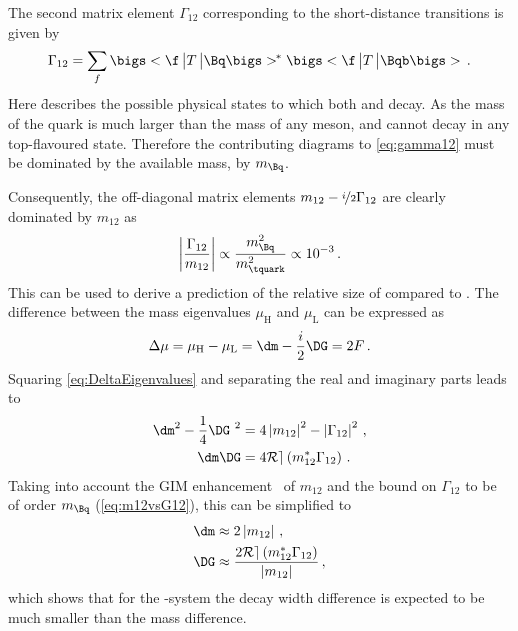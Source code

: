 The second matrix element $\Gamma_{12}$ corresponding to the short-distance transitions is given by
\begin{equation}
\Gamma_{12}=\sum_f\bigs<\f\,\big|T\,\big|\Bq\bigs>^{\kern -0.08em *}\bigs<\f\,\big|T\,\big|\Bqb\bigs>\,.\label{eq:gamma12}
\end{equation}
Here \f describes the possible physical states to which both \Bq and \Bqb decay.
As the mass of the \tquark quark is much larger than the mass of any \B meson, \Bq and \Bqb cannot decay in any top-flavoured state.
Therefore the contributing diagrams to \cref{eq:gamma12} must be dominated by the available mass, \ie by $m_\Bq$.

Consequently, the off-diagonal matrix elements $m_{12}-\nicefrac{i}{2}\Gamma_{12}$ are clearly dominated by $m_{12}$ as
\begin{equation}
\left|\frac{\Gamma_{12}}{m_{12}}\right|\propto\frac{m_{\Bq}^2}{m_\tquark^2}\propto10^{-3}\,.\label{eq:m12vsG12}
\end{equation}
This can be used to derive a prediction of the relative size of \DG compared to \dm.
The difference between the mass eigenvalues $\mu_\text{H}$ and $\mu_\text{L}$ can be expressed as
\begin{equation}
\Delta\mu=\mu_\text{H}-\mu_\text{L}=\dm-\frac{i}{2}\DG=2F\,.\label{eq:DeltaEigenvalues}
\end{equation}
Squaring \cref{eq:DeltaEigenvalues} and separating the real and imaginary parts leads to
\begin{equation}
\begin{aligned}
\dm^2-\frac{1}{4}\DG^{\kern 3.4pt2}&=4\left|m_{12}\right|^2-\left|\Gamma_{12}\right|^2\,,\\
\dm\DG&=4\mathcal{R{}e}\left(m_{12}^\ast\Gamma_{12}\right)\,.
\end{aligned}
\end{equation}
Taking into account the GIM enhancement~\cite{PhysRevD.2.1285} of $m_{12}$ and the bound on $\Gamma_{12}$ to be of order $m_\Bq$ (\cref{eq:m12vsG12}), this can be simplified to
\begin{equation}
\begin{aligned}
\dm&\approx2\left|m_{12}\right|\,,\\
\DG&\approx\frac{2\mathcal{R{}e}\left(m_{12}^\ast\Gamma_{12}\right)}{\left|m_{12}\right|}\,,
\end{aligned}
\end{equation}
which shows that for the \Bz-system the decay width difference is expected to be much smaller than the mass difference.

